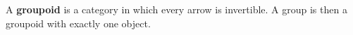 A \textbf{groupoid} is a category in which every arrow is invertible. A group is then a groupoid with exactly one object.